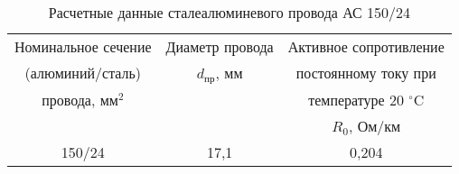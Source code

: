 \begin{table}[H]
	\caption{Расчетные данные сталеалюминевого провода АС 150/24}
	\begin{tabular}{|c|c|c|}
		\hline
		Номинальное сечение & Диаметр провода  & Активное сопротивление \\
		(алюминий/сталь) & $d_{\text{пр}}$, мм & постоянному току при \\
		провода, $\text{мм}^2$ & & температуре 20 $^{\circ}$C \\
		 & & $R_0$, Ом/км \\
		\hline
		150/24 & 17,1 & 0,204 \\
		\hline
	\end{tabular}
	\label{tab:tabl3}
\end{table}


\renewcommand{\thefigure}{\arabic{chapter}.\arabic{figure}} %
\renewcommand{\thetable}{\arabic{chapter}.\arabic{table}} %

